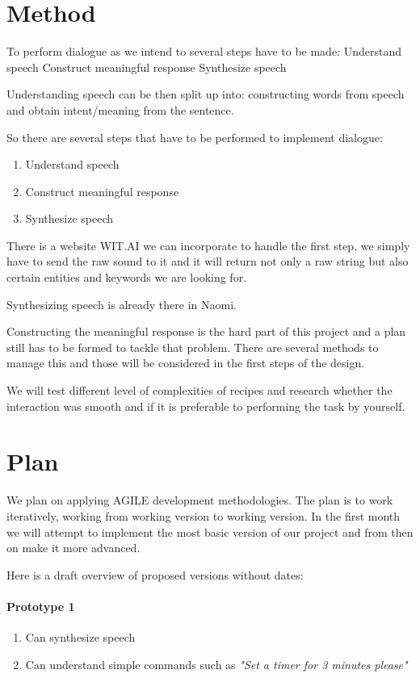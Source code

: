 \documentclass[11pt]{article} %
\begin{document}
\section{Method}
To perform dialogue as we intend to several steps have to be made:
Understand speech
Construct meaningful response
Synthesize speech

Understanding speech can be then split up into: constructing words from speech and obtain intent/meaning from the sentence.

So there are several steps that have to be performed to implement dialogue:
\begin{enumerate}
\item Understand speech
\item Construct meaningful response
\item Synthesize speech
\end{enumerate}

There is a website WIT.AI we can incorporate to handle the first step, we simply have to send the raw sound to it and it will return not only a raw string but also certain entities and keywords we are looking for.

Synthesizing speech is already there in Naomi. 

Constructing the meaningful response is the hard part of this project and a plan still has to be formed to tackle that problem. There are several methods to manage this and those will be considered in the first steps of the design.

We will test different level of complexities of recipes and research whether the interaction was smooth and if it is preferable to performing the task by yourself.

\section{Plan}
We plan on applying AGILE development methodologies. The plan is to work iteratively, working from working version to working version. In the first month we will attempt to implement the most basic version of our project and from then on make it more advanced.

Here is a draft overview of proposed versions without dates:

\paragraph{Prototype 1}
\begin{enumerate}
\item Can synthesize speech
\item Can understand simple commands such as \emph{"Set a timer for 3 minutes please"}

\end{enumerate}
\end{document}
